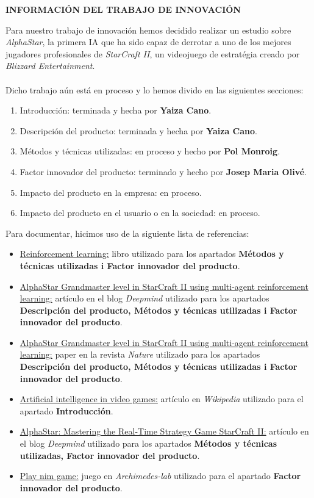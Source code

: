 \documentclass[a4paper,10pt]{report}
\begin{document}
	
\newpage
\begin{flushleft}
\textbf{INFORMACIÓN DEL TRABAJO DE INNOVACIÓN} \\
\end{flushleft}
    Para nuestro trabajo de innovación hemos decidido realizar un estudio sobre \textit{AlphaStar}, la primera IA que ha sido capaz de derrotar a uno de los mejores jugadores profesionales de \textit{StarCraft II}, un videojuego de estratégia creado por \textit{Blizzard Entertainment}.\\\\
    Dicho trabajo aún está en proceso y lo hemos divido en las siguientes secciones:
    \begin{enumerate}
        \item Introducción: terminada y hecha por \textbf{Yaiza Cano}.
        \item Descripción del producto: terminada y hecha por \textbf{Yaiza Cano}.
        \item Métodos y técnicas utilizadas: en proceso y hecho por \textbf{Pol Monroig}.
        \item Factor innovador del producto: terminado y hecho por \textbf{Josep Maria Olivé}.
    	\item Impacto del producto en la empresa: en proceso.
    	\item Impacto del producto en el usuario o en la sociedad: en proceso.\\
    \end{enumerate}
    Para documentar, hicimos uso de la siguiente lista de referencias:
    \begin{itemize}
        \item \uline{Reinforcement learning:} libro utilizado para los apartados \textbf{Métodos y técnicas utilizadas i Factor innovador del producto}.
        \item \uline{AlphaStar Grandmaster level in StarCraft II using multi-agent reinforcement learning:} artículo en el blog \textit{Deepmind} utilizado para los apartados \textbf{Descripción del producto, Métodos y técnicas utilizadas i Factor innovador del producto}.
        \item \uline{AlphaStar Grandmaster level in StarCraft II using multi-agent reinforcement learning:} paper en la revista \textit{Nature} utilizado para los apartados \textbf{Descripción del producto, Métodos y técnicas utilizadas i Factor innovador del producto}.
        \item \uline{Artificial intelligence in video games:} artículo en \textit{Wikipedia} utilizado para el apartado \textbf{Introducción}.
        \item \uline{AlphaStar: Mastering the Real-Time Strategy Game StarCraft II:} artículo en el blog \textit{Deepmind} utilizado para los apartados \textbf{Métodos y técnicas utilizadas, Factor innovador del producto}.
        \item \uline{Play nim game:} juego en \textit{Archimedes-lab} utilizado para el apartado \textbf{Factor innovador del producto}.
        
    \end{itemize}
\end{document}
